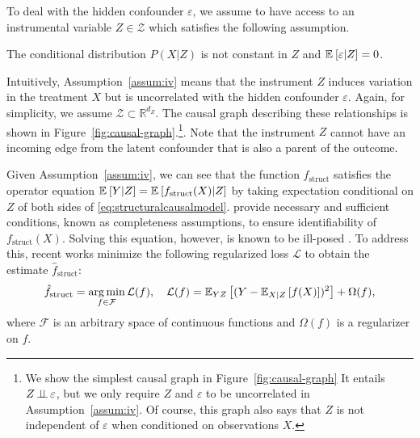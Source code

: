 To deal with the hidden confounder $\varepsilon$, we assume to have access to an instrumental variable $Z \in \mathcal{Z}$ which satisfies the following assumption. 
\begin{assum}\label{assum:iv}
    The conditional distribution $P(X | Z)$ is not constant in $Z$ and $\expect{\varepsilon | Z} = 0$.
\end{assum}
Intuitively, Assumption~\ref{assum:iv} means that the instrument $Z$ induces variation in the treatment $X$ but is uncorrelated with the hidden confounder $\varepsilon$. Again, for simplicity, we assume $\mathcal{Z} \subset \mathbb{R}^{d_Z}$. The causal graph describing these relationships is shown in Figure~\ref{fig:causal-graph}.\footnote{We show the simplest causal graph in Figure~\ref{fig:causal-graph}
It entails $Z \indepe \varepsilon$,
but we only require $Z$ and $\varepsilon$ to be uncorrelated in Assumption~\ref{assum:iv}. Of course, this graph also says that $Z$ is not independent of $\varepsilon$ when conditioned on  observations $X$.}. Note that the instrument $Z$ cannot have an incoming edge from the latent confounder that is also a parent of the outcome.

Given Assumption~\ref{assum:iv}, we can see that the function $f_\mathrm{struct}$ satisfies the operator equation $\expect{Y|Z} = \expect{f_\mathrm{struct}(X)|Z}$ by taking expectation conditional on $Z$ of both sides of \eqref{eq:structuralcausalmodel}. \citet{Newey2003} provide necessary and sufficient conditions, known as completeness assumptions, to ensure identifiability of $f_\mathrm{struct}(X)$. Solving this equation, however, is known to be ill-posed \citep{Nashed1974}. To address this, recent works \citep{Carrasco2007,Darolles2011,Muandet2019,Singh2019} minimize the following regularized loss $\mathcal{L}$ to obtain the estimate $\hat{f}_{\mathrm{struct}}$:
\begin{align}
    \hat{f}_{\mathrm{struct}} = \argmin_{f\in \mathcal{F}} \mathcal{L}(f), \quad \mathcal{L}(f) = \expect[YZ]{(Y - \expect[X|Z]{f(X)})^2} + \Omega(f), \label{eq:total-loss}
\end{align}
where $\mathcal{F}$ is an arbitrary space of continuous functions and $\Omega(f)$ is a regularizer on $f$.
